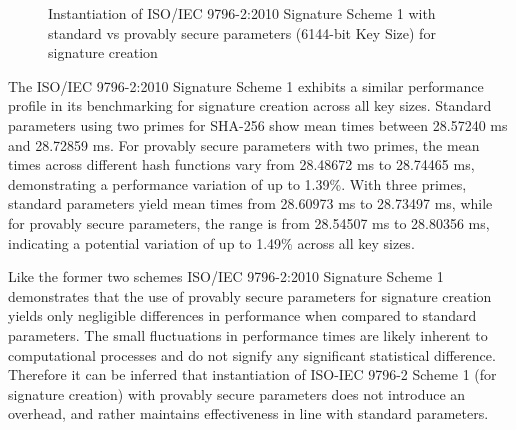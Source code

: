 \documentclass[]{final_report}
\theoremstyle{definition}
\begin{document}
\begin{figure}[H]
    \centering %
     \caption{Instantiation of ISO/IEC 9796-2:2010 Signature Scheme 1 with standard vs provably secure parameters (6144-bit Key Size) for signature creation}
    \begin{minipage}{\textwidth}
        \centering
    \end{minipage}
         \label{iso_sign_6144bit_table}
\end{figure}

The ISO/IEC 9796-2:2010 Signature Scheme 1 exhibits a similar performance profile in its benchmarking for signature creation across all key sizes. Standard parameters using two primes for SHA-256 show mean times between 28.57240 ms and 28.72859 ms. For provably secure parameters with two primes, the mean times across different hash functions vary from 28.48672 ms to 28.74465 ms, demonstrating a performance variation of up to 1.39\%. With three primes, standard parameters yield mean times from 28.60973 ms to 28.73497 ms, while for provably secure parameters, the range is from 28.54507 ms to 28.80356 ms, indicating a potential variation of up to 1.49\% across all key sizes.


Like the former two schemes ISO/IEC 9796-2:2010 Signature Scheme 1 demonstrates that the use of provably secure parameters for signature creation yields only negligible differences in performance when compared to standard parameters.  The small fluctuations in performance times are likely inherent to computational processes and do not signify any significant statistical difference. Therefore it can be inferred that instantiation of ISO-IEC 9796-2 Scheme 1 (for signature creation) with provably secure parameters does not introduce an overhead, and rather maintains effectiveness in line with standard parameters.
\end{document}
